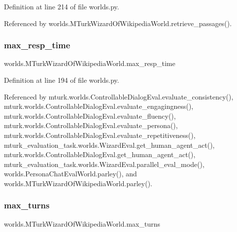 Definition at line 214 of file worlds.\+py.



Referenced by worlds.\+M\+Turk\+Wizard\+Of\+Wikipedia\+World.\+retrieve\+\_\+passages().

\mbox{\label{classworlds_1_1MTurkWizardOfWikipediaWorld_ad928e9dd4376aaf16afc88cea85efe80}} 
\subsubsection{\texorpdfstring{max\+\_\+resp\+\_\+time}{max\_resp\_time}}
{\footnotesize\ttfamily worlds.\+M\+Turk\+Wizard\+Of\+Wikipedia\+World.\+max\+\_\+resp\+\_\+time}



Definition at line 194 of file worlds.\+py.



Referenced by mturk.\+worlds.\+Controllable\+Dialog\+Eval.\+evaluate\+\_\+consistency(), mturk.\+worlds.\+Controllable\+Dialog\+Eval.\+evaluate\+\_\+engagingness(), mturk.\+worlds.\+Controllable\+Dialog\+Eval.\+evaluate\+\_\+fluency(), mturk.\+worlds.\+Controllable\+Dialog\+Eval.\+evaluate\+\_\+persona(), mturk.\+worlds.\+Controllable\+Dialog\+Eval.\+evaluate\+\_\+repetitiveness(), mturk\+\_\+evaluation\+\_\+task.\+worlds.\+Wizard\+Eval.\+get\+\_\+human\+\_\+agent\+\_\+act(), mturk.\+worlds.\+Controllable\+Dialog\+Eval.\+get\+\_\+human\+\_\+agent\+\_\+act(), mturk\+\_\+evaluation\+\_\+task.\+worlds.\+Wizard\+Eval.\+parallel\+\_\+eval\+\_\+mode(), worlds.\+Persona\+Chat\+Eval\+World.\+parley(), and worlds.\+M\+Turk\+Wizard\+Of\+Wikipedia\+World.\+parley().

\mbox{\label{classworlds_1_1MTurkWizardOfWikipediaWorld_a91af484c279c33ecd9fe06b6607ca3cc}} 
\subsubsection{\texorpdfstring{max\+\_\+turns}{max\_turns}}
{\footnotesize\ttfamily worlds.\+M\+Turk\+Wizard\+Of\+Wikipedia\+World.\+max\+\_\+turns}



